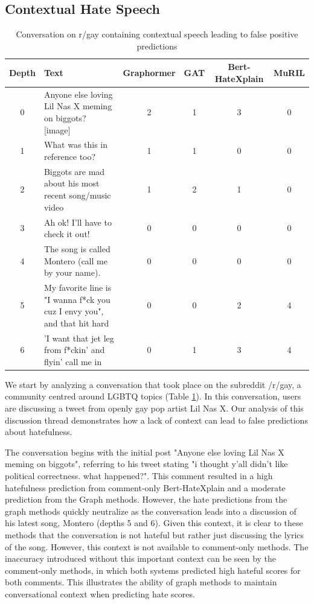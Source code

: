 \documentclass[letterpaper]{article} %
\begin{document}
\subsection{Contextual Hate Speech}
\begin{table}
    \centering
        \caption{Conversation on r/gay containing contextual speech leading to false positive predictions}
    \begin{tabular}{c|p{8cm}|c|c|c|c}
        Depth & Text & Graphormer & GAT & Bert-HateXplain & MuRIL \\
        \hline
        \hline
        0 & Anyone else loving Lil Nas X meming on biggots? [image] & 2 & 1 & 3 & 0 \\
        \hline
        1 & What was this in reference too? & 1 & 1 & 0 & 0  \\
        \hline 
        2 & Biggots are mad about his most recent song/music video & 1 & 2 & 1 & 0  \\
        \hline
        3 & Ah ok! I'll have to check it out! & 0 & 0 & 0 & 0 \\
        \hline
        4 & The song is called Montero (call me by your name). & 0 & 0 & 0 & 0 \\
        \hline
        5 & My favorite line is "I wanna f*ck you cuz I envy you", and that hit hard & 0 & 0 & 2 & 4 \\
        \hline
        6 & 'I want that jet leg from f*ckin' and flyin' call me in & 0 & 1 & 3 & 4 \\
    \end{tabular}
    \label{tab:contextual-gay}
\end{table}
We start by analyzing a conversation that took place on the subreddit /r/gay, a community centred around LGBTQ topics (Table \ref{tab:contextual-gay}). In this conversation, users are discussing a tweet from openly gay pop artist Lil Nas X. Our analysis of this discussion thread demonstrates how a lack of context can lead to false predictions about hatefulness. 

The conversation begins with the initial post "Anyone else loving Lil Nas X meming on biggots", referring to his tweet stating "i thought y'all didn't like political correctness. what happened?". This comment resulted in a high hatefulness prediction from comment-only Bert-HateXplain and a moderate prediction from the Graph methods. However, the hate predictions from the graph methods quickly neutralize as the conversation leads into a discussion of his latest song, Montero (depths 5 and 6). Given this context, it is clear to these methods that the conversation is not hateful but rather just discussing the lyrics of the song. However, this context is not available to comment-only methods. The inaccuracy introduced without this important context can be seen by the comment-only methods, in which both systems predicted high hateful scores for both comments. This illustrates the ability of graph methods to maintain conversational context when predicting hate scores. 
\end{document}
